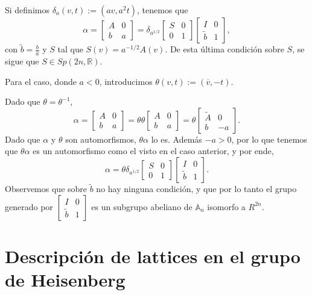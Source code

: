 \documentclass[12pt]{article}
\begin{document}
Si definimos $\delta_a (v,t) :=(a v,a^2 t)$, tenemos que 
$$\alpha=
\begin{bmatrix}
A & 0\\
b & a
\end{bmatrix}=
\delta_{a^{1/2}}
\begin{bmatrix}
S & 0\\
0 & 1
\end{bmatrix}
\begin{bmatrix}
I & 0\\
\tilde{b} & 1
\end{bmatrix},
$$
con $\tilde{b}=\frac{b}{a}$ y  $S$ tal que $S(v)=a^{-1/2} A(v)$.
De esta última condición sobre $S$, se sigue que $S \in Sp(2n,\mathbb{R}).$

Para el caso, donde $a<0$, introducimos $\theta(v,t):=(\overline{v},-t)$.

Dado que $\theta=\theta^{-1}$,
$$\alpha=
\begin{bmatrix}
A & 0\\
b & a
\end{bmatrix}=
\theta 
\theta
\begin{bmatrix}
A & 0\\
b & a
\end{bmatrix}=
\theta
\begin{bmatrix}
\tilde{A} & 0\\
b & -a
\end{bmatrix}.
$$
Dado que $\alpha$ y $\theta$ son automorfismos, $\theta \alpha$ lo es. Además $-a>0$, por lo que tenemos que $\theta \alpha$ es 
un automorfismo como el visto en el caso anterior, y por ende,
$$\alpha=
\theta
\delta_{a^{1/2}}
\begin{bmatrix}
S & 0\\
0 & 1
\end{bmatrix}
\begin{bmatrix}
I & 0\\
\tilde{b} & 1
\end{bmatrix}.
$$
Observemos que sobre $\tilde{b}$ no hay ninguna condición, y que por lo tanto el grupo generado por
$\begin{bmatrix}
I & 0\\
\tilde{b} & 1
\end{bmatrix}
$
es un subgrupo abeliano de $\mathbb{A}_n$ isomorfo a $R^{2n}$.

\section{Descripción de lattices en el grupo de Heisenberg}
\end{document}
